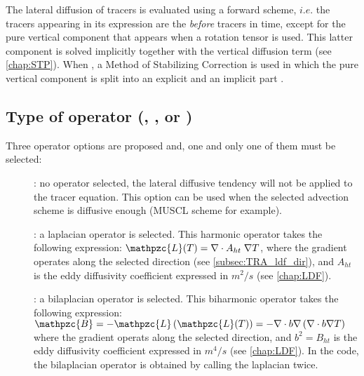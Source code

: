 \documentclass[../tex_main/NEMO_manual]{subfiles}
\begin{document}
The lateral diffusion of tracers is evaluated using a forward scheme, 
$i.e.$ the tracers appearing in its expression are the \textit{before} tracers in time, 
except for the pure vertical component that appears when a rotation tensor is used. 
This latter component is solved implicitly together with the vertical diffusion term (see \autoref{chap:STP}). 
When , a Method of Stabilizing Correction is used in which 
the pure vertical component is split into an explicit and an implicit part \citep{Lemarie_OM2012}.

\subsection[Type of operator (\protect\np{ln\_traldf}\{\_NONE,\_lap,\_blp\}\})]
			     {Type of operator (\protect{}, \protect{}, or \protect{}) } 
\label{subsec:TRA_ldf_op}

Three operator options are proposed and, one and only one of them must be selected:
\begin{description}
\item []: no operator selected, the lateral diffusive tendency will not be 
applied to the tracer equation. This option can be used when the selected advection scheme 
is diffusive enough (MUSCL scheme for example).
\item []: a laplacian operator is selected. This harmonic operator 
takes the following expression:  $\mathpzc{L}(T)=\nabla \cdot A_{ht}\;\nabla T $, 
where the gradient operates along the selected direction (see \autoref{subsec:TRA_ldf_dir}),
and $A_{ht}$ is the eddy diffusivity coefficient expressed in $m^2/s$ (see \autoref{chap:LDF}).
\item []: a bilaplacian operator is selected. This biharmonic operator 
takes the following expression:  
$\mathpzc{B}=- \mathpzc{L}\left(\mathpzc{L}(T) \right) = -\nabla \cdot b\nabla \left( {\nabla \cdot b\nabla T} \right)$ 
where the gradient operats along the selected direction,
and $b^2=B_{ht}$ is the eddy diffusivity coefficient expressed in $m^4/s$  (see \autoref{chap:LDF}).
In the code, the bilaplacian operator is obtained by calling the laplacian twice.
\end{description}
\end{document}
